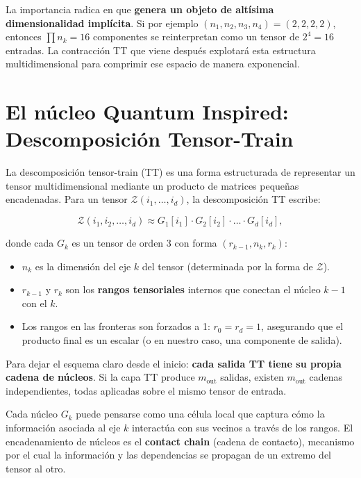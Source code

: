 La importancia radica en que \textbf{genera un objeto de altísima dimensionalidad implícita}. Si por ejemplo \((n_1, n_2, n_3, n_4) = (2,2,2,2)\), entonces $\prod n_k = 16$ componentes se reinterpretan como un tensor de \(2^4 = 16\) entradas. La contracción TT que viene después explotará esta estructura multidimensional para comprimir ese espacio de manera exponencial.

\section{El núcleo Quantum Inspired: Descomposición Tensor-Train}

La descomposición tensor-train (TT) es una forma estructurada de representar un tensor multidimensional mediante un producto de matrices pequeñas encadenadas. Para un tensor $\mathcal{Z}(i_1, \ldots, i_d)$, la descomposición TT escribe:

\begin{equation}
\mathcal{Z}(i_1,i_2,\ldots,i_d) \approx G_1[i_1] \cdot G_2[i_2] \cdot \ldots \cdot G_d[i_d],
\label{eq:qi-tt-decomp}
\end{equation}

donde cada $G_k$ es un tensor de orden 3 con forma $(r_{k-1}, n_k, r_k)$:
\begin{itemize}
  \item $n_k$ es la dimensión del eje $k$ del tensor (determinada por la forma de $\mathcal{Z}$).
  \item $r_{k-1}$ y $r_k$ son los \textbf{rangos tensoriales} internos que conectan el núcleo $k-1$ con el $k$.
  \item Los rangos en las fronteras son forzados a 1: $r_0 = r_d = 1$, asegurando que el producto final es un escalar (o en nuestro caso, una componente de salida).
\end{itemize}

Para dejar el esquema claro desde el inicio: \textbf{cada salida TT tiene su propia cadena de núcleos}. Si la capa TT produce $m_{\text{out}}$ salidas, existen $m_{\text{out}}$ cadenas independientes, todas aplicadas sobre el mismo tensor de entrada.

Cada núcleo $G_k$ puede pensarse como una célula local que captura cómo la información asociada al eje $k$ interactúa con sus vecinos a través de los rangos. El encadenamiento de núcleos es el \textbf{contact chain} (cadena de contacto), mecanismo por el cual la información y las dependencias se propagan de un extremo del tensor al otro.

